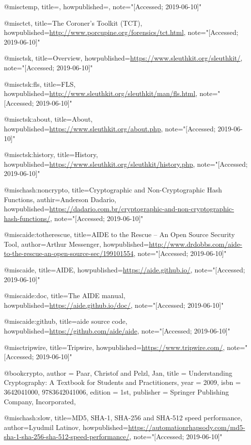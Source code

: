 
@misc{temp,
  title={{}},
  howpublished={\url{}},
  note="[Accessed; 2019-06-10]"
}

@misc{tct,
  title={{The Coroner's Toolkit (TCT)}},
  howpublished={\url{http://www.porcupine.org/forensics/tct.html}},
  note="[Accessed; 2019-06-10]"
}

@misc{tsk,
  title={{Overview}},
  howpublished={\url{https://www.sleuthkit.org/sleuthkit/}},
  note="[Accessed; 2019-06-10]"
}

@misc{tsk:fls,
  title={{FLS}},
  howpublished={\url{http://www.sleuthkit.org/sleuthkit/man/fls.html}},
  note="[Accessed; 2019-06-10]"
}

@misc{tsk:about,
  title={{About}},
  howpublished={\url{https://www.sleuthkit.org/about.php}},
  note="[Accessed; 2019-06-10]"
}

@misc{tsk:history,
  title={{History}},
  howpublished={\url{https://www.sleuthkit.org/sleuthkit/history.php}},
  note="[Accessed; 2019-06-10]"
}

@misc{hash:noncrypto,
  title={{Cryptographic and Non-Cryptographic Hash Functions}},
  authir={Anderson Dadario},
  howpublished={\url{https://dadario.com.br/cryptographic-and-non-cryptographic-hash-functions/}},
  note="[Accessed; 2019-06-10]"
}

@misc{aide:totherescue,
  title={{AIDE to the Rescue -- An Open Source Security Tool}},
  author={Arthur Messenger},
  howpublished={\url{http://www.drdobbs.com/aide-to-the-rescue-an-open-source-sec/199101554}},
  note="[Accessed; 2019-06-10]"
}

@misc{aide,
  title={{AIDE}},
  howpublished={\url{https://aide.github.io/}},
  note="[Accessed; 2019-06-10]"
}

@misc{aide:doc,
  title={{The AIDE manual}},
  howpublished={\url{https://aide.github.io/doc/}},
  note="[Accessed; 2019-06-10]"
}

@misc{aide:github,
  title={{aide source code}},
  howpublished={\url{https://github.com/aide/aide}},
  note="[Accessed; 2019-06-10]"
}


@misc{tripwire,
  title={{Tripwire}},
  howpublished={\url{https://www.tripwire.com/}},
  note="[Accessed; 2019-06-10]"
}

@book{crypto,
 author = {Paar, Christof and Pelzl, Jan},
 title = {Understanding Cryptography: A Textbook for Students and Practitioners},
 year = {2009},
 isbn = {3642041000, 9783642041006},
 edition = {1st},
 publisher = {Springer Publishing Company, Incorporated},
}

@misc{hash:slow,
  title={{MD5, SHA-1, SHA-256 and SHA-512 speed performance}},
  author={Lyudmil Latinov},
  howpublished={\url{https://automationrhapsody.com/md5-sha-1-sha-256-sha-512-speed-performance/}},
  note="[Accessed; 2019-06-10]"
}

